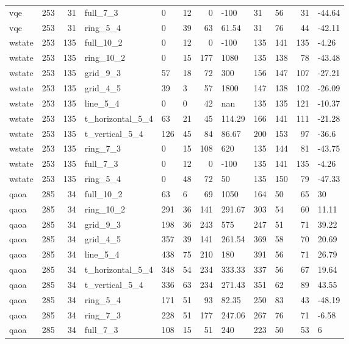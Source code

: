 \begin{longtable}{lrrlllrlllrl}
vqe & 253 & 31 & full\_7\_3 & 0 & 12 & 0 & -100 & 31 & 56 & 31 & -44.64 \\
vqe & 253 & 31 & ring\_5\_4 & 0 & 39 & 63 & 61.54 & 31 & 76 & 44 & -42.11 \\
wstate & 253 & 135 & full\_10\_2 & 0 & 12 & 0 & -100 & 135 & 141 & 135 & -4.26 \\
wstate & 253 & 135 & ring\_10\_2 & 0 & 15 & 177 & 1080 & 135 & 138 & 78 & -43.48 \\
wstate & 253 & 135 & grid\_9\_3 & 57 & 18 & 72 & 300 & 156 & 147 & 107 & -27.21 \\
wstate & 253 & 135 & grid\_4\_5 & 39 & 3 & 57 & 1800 & 147 & 138 & 102 & -26.09 \\
wstate & 253 & 135 & line\_5\_4 & 0 & 0 & 42 & nan & 135 & 135 & 121 & -10.37 \\
wstate & 253 & 135 & t\_horizontal\_5\_4 & 63 & 21 & 45 & 114.29 & 166 & 141 & 111 & -21.28 \\
wstate & 253 & 135 & t\_vertical\_5\_4 & 126 & 45 & 84 & 86.67 & 200 & 153 & 97 & -36.6 \\
wstate & 253 & 135 & ring\_7\_3 & 0 & 15 & 108 & 620 & 135 & 144 & 81 & -43.75 \\
wstate & 253 & 135 & full\_7\_3 & 0 & 12 & 0 & -100 & 135 & 141 & 135 & -4.26 \\
wstate & 253 & 135 & ring\_5\_4 & 0 & 48 & 72 & 50 & 135 & 150 & 79 & -47.33 \\
qaoa & 285 & 34 & full\_10\_2 & 63 & 6 & 69 & 1050 & 164 & 50 & 65 & 30 \\
qaoa & 285 & 34 & ring\_10\_2 & 291 & 36 & 141 & 291.67 & 303 & 54 & 60 & 11.11 \\
qaoa & 285 & 34 & grid\_9\_3 & 198 & 36 & 243 & 575 & 247 & 51 & 71 & 39.22 \\
qaoa & 285 & 34 & grid\_4\_5 & 357 & 39 & 141 & 261.54 & 369 & 58 & 70 & 20.69 \\
qaoa & 285 & 34 & line\_5\_4 & 438 & 75 & 210 & 180 & 391 & 56 & 71 & 26.79 \\
qaoa & 285 & 34 & t\_horizontal\_5\_4 & 348 & 54 & 234 & 333.33 & 337 & 56 & 67 & 19.64 \\
qaoa & 285 & 34 & t\_vertical\_5\_4 & 336 & 63 & 234 & 271.43 & 351 & 62 & 89 & 43.55 \\
qaoa & 285 & 34 & ring\_5\_4 & 171 & 51 & 93 & 82.35 & 250 & 83 & 43 & -48.19 \\
qaoa & 285 & 34 & ring\_7\_3 & 228 & 51 & 177 & 247.06 & 267 & 76 & 71 & -6.58 \\
qaoa & 285 & 34 & full\_7\_3 & 108 & 15 & 51 & 240 & 223 & 50 & 53 & 6 \\

\end{longtable}
